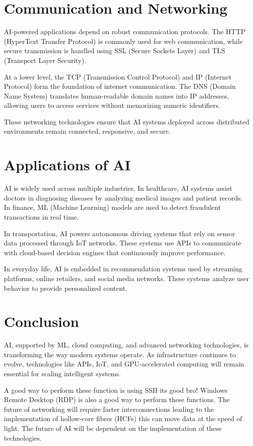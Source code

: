 \documentclass[11pt]{article}
\begin{document}
\section{Communication and Networking}

AI-powered applications depend on robust communication protocols. The HTTP (HyperText Transfer Protocol) 
is commonly used for web communication, while secure transmission is handled using SSL (Secure Sockets Layer) 
and TLS (Transport Layer Security).

At a lower level, the TCP (Transmission Control Protocol) and IP (Internet Protocol) form the foundation 
of internet communication. The DNS (Domain Name System) translates human-readable domain names into IP addresses, 
allowing users to access services without memorizing numeric identifiers.

These networking technologies ensure that AI systems deployed across distributed environments remain connected, 
responsive, and secure.

\section{Applications of AI}

AI is widely used across multiple industries. In healthcare, AI systems assist doctors in diagnosing diseases 
by analyzing medical images and patient records. In finance, ML (Machine Learning) models are used to detect 
fraudulent transactions in real time.

In transportation, AI powers autonomous driving systems that rely on sensor data processed through IoT networks. 
These systems use APIs to communicate with cloud-based decision engines that continuously improve performance.

In everyday life, AI is embedded in recommendation systems used by streaming platforms, online retailers, and 
social media networks. These systems analyze user behavior to provide personalized content.

\section{Conclusion}

AI, supported by ML, cloud computing, and advanced networking 
technologies, is transforming the way modern systems operate. As infrastructure continues to evolve, technologies 
like APIs, IoT, and GPU-accelerated computing will remain essential for scaling intelligent systems.

A good way to perform these function is using SSH its good bro! Windows Remote Desktop (RDP) is also a good way to perform these functions. The future of networking will require faster interconnections leading to the implementation of hollow-core fibres (HCFs) this can move data at the speed of light. The future of AI will be dependent on the implementation of these technologies.  
\end{document}
